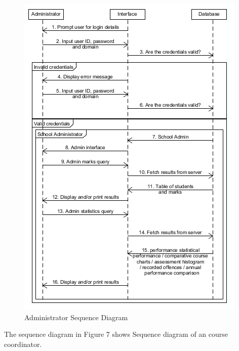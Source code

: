 	
	\begin{center}
		\begin{figure}[h]
			\centering
			\includegraphics[trim={0cm 0cm 0cm 0cm },clip,scale = 1.1]{AdministratorSequence}
			\caption{ Administrator Sequence Diagram}
		\end{figure}
	\end{center}
	\newpage
	
		The sequence diagram in Figure 7 shows Sequence diagram of an course coordinator.  
	
